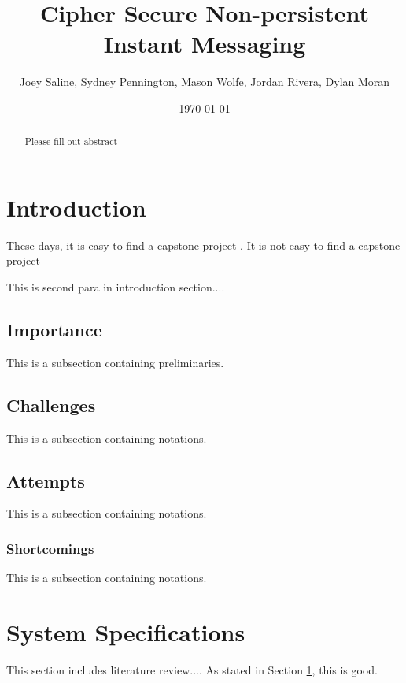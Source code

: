 \documentclass[11pt]{article}
\date{
\today
}
\theoremstyle{plain}
\theoremstyle{definition}
\begin{document}
\title{Cipher Secure Non-persistent Instant Messaging}
\author{Joey Saline, Sydney Pennington, Mason Wolfe, Jordan Rivera, Dylan Moran}
\maketitle
	
\begin{abstract}
Please fill out abstract
		
\end{abstract}


\section{Introduction}\label{sec:intro}
These days, it is easy to find a capstone project \cite{Atrey2021BrickHouseSecuity}. It is not 
easy to find a capstone project 

This is second para in introduction section....

\subsection{Importance}\label{sec:importance}
This is a subsection containing preliminaries.

\subsection{Challenges}\label{sec:challenges}
This is a subsection containing notations.

\subsection{Attempts}\label{sec:attempts}
This is a subsection containing notations.

\subsubsection{Shortcomings}\label{sec:shortcomings}
This is a subsection containing notations.

\section{System Specifications}\label{sec:sysspecs}
This section includes literature review.... As stated in Section \ref{sec:intro}, this is good.
\end{document}
